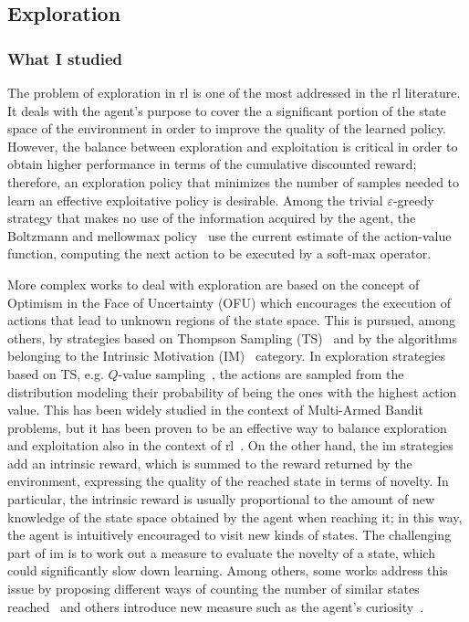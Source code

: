 \subsection{Exploration}
\subsubsection{What I studied}
The problem of exploration in \gls{rl} is one of the most addressed in the \gls{rl} literature. It deals with the agent's purpose to cover the a significant portion of the state space of the environment in order to improve the quality of the learned policy. However, the balance between exploration and exploitation is critical in order to obtain higher performance in terms of the cumulative discounted reward; therefore, an exploration policy that minimizes the number of samples needed to learn an effective exploitative policy is desirable. Among the trivial $\varepsilon$-greedy strategy that makes no use of the information acquired by the agent, the Boltzmann and mellowmax policy~\cite{asadi2016alternative} use the current estimate of the action-value function, computing the next action to be executed by a soft-max operator.

More complex works to deal with exploration are based on the concept of Optimism in the Face of Uncertainty (OFU) which encourages the execution of actions that lead to unknown regions of the state space. This is pursued, among others, by strategies based on Thompson Sampling (TS)~\cite{thompson1933likelihood} and by the algorithms belonging to the Intrinsic Motivation (IM)~\cite{schmidhuber1991possibility} category. In exploration strategies based on TS, e.g. $Q$-value sampling~\cite{dearden1998bayesian}, the actions are sampled from the distribution modeling their probability of being the ones with the highest action value. This has been widely studied in the context of Multi-Armed Bandit problems, but it has been proven to be an effective way to balance exploration and exploitation also in the context of \gls{rl}~\cite{auer2007logarithmic}. On the other hand, the \gls{im} strategies add an intrinsic reward, which is summed to the reward returned by the environment, expressing the quality of the reached state in terms of novelty. In particular, the intrinsic reward is usually proportional to the amount of new knowledge of the state space obtained by the agent when reaching it; in this way, the agent is intuitively encouraged to visit new kinds of states. The challenging part of \gls{im} is to work out a measure to evaluate the novelty of a state, which could significantly slow down learning. Among others, some works address this issue by proposing different ways of counting the number of similar states reached~\cite{tang2017exploration} and others introduce new measure such as the agent's curiosity~\cite{schmidhuber1991possibility, pathak2017curiosity}.

